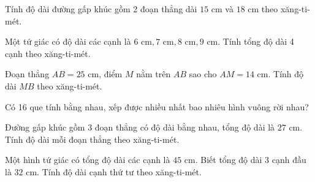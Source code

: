 \begin{ex} %
Tính độ dài đường gấp khúc gồm 2 đoạn thẳng dài $15\text{ cm}$ và $18\text{ cm}$ theo xăng-ti-mét.
\end{ex}

\begin{ex} %
Một tứ giác có độ dài các cạnh là $6\text{ cm}, 7\text{ cm}, 8\text{ cm}, 9\text{ cm}$. Tính tổng độ dài 4 cạnh theo xăng-ti-mét.
\end{ex}

\begin{ex} %
Đoạn thẳng $AB = 25\text{ cm}$, điểm $M$ nằm trên $AB$ sao cho $AM = 14\text{ cm}$. Tính độ dài $MB$ theo xăng-ti-mét.
\end{ex}

\begin{ex} %
Có 16 que tính bằng nhau, xếp được nhiều nhất bao nhiêu hình vuông rời nhau?
\end{ex}

\begin{ex} %
Đường gấp khúc gồm 3 đoạn thẳng có độ dài bằng nhau, tổng độ dài là $27\text{ cm}$. Tính độ dài mỗi đoạn thẳng theo xăng-ti-mét.
\end{ex}

\begin{ex} %
Một hình tứ giác có tổng độ dài các cạnh là $45\text{ cm}$. Biết tổng độ dài 3 cạnh đầu là $32\text{ cm}$. Tính độ dài cạnh thứ tư theo xăng-ti-mét.
\end{ex}
